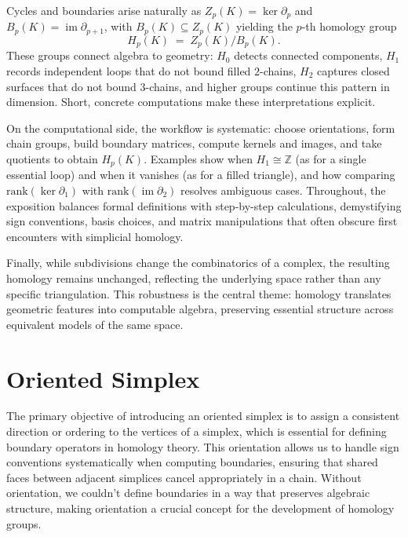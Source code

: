 \documentclass[12pt,oneside,reqno]{amsart}
\theoremstyle{plain}
\theoremstyle{definition}
\theoremstyle{remark}
\newcommand{\0}{{\textbf{0}}}
\begin{document}
Cycles and boundaries arise naturally as \(Z_p(K) = \ker \partial_p\) and \(B_p(K)=\operatorname{im}\partial_{p+1}\), with \(B_p(K)\subseteq Z_p(K)\) yielding the \(p\)-th homology group
\[
H_p(K) \;=\; Z_p(K)\big/ B_p(K).
\]
These groups connect algebra to geometry: \(H_0\) detects connected components, \(H_1\) records independent loops that do not bound filled \(2\)-chains, \(H_2\) captures closed surfaces that do not bound \(3\)-chains, and higher groups continue this pattern in dimension. Short, concrete computations make these interpretations explicit.

On the computational side, the workflow is systematic: choose orientations, form chain groups, build boundary matrices, compute kernels and images, and take quotients to obtain \(H_p(K)\). Examples show when \(H_1\cong \mathbb{Z}\) (as for a single essential loop) and when it vanishes (as for a filled triangle), and how comparing \(\mathrm{rank}(\ker \partial_1)\) with \(\mathrm{rank}(\operatorname{im}\partial_2)\) resolves ambiguous cases. Throughout, the exposition balances formal definitions with step-by-step calculations, demystifying sign conventions, basis choices, and matrix manipulations that often obscure first encounters with simplicial homology.

Finally, while subdivisions change the combinatorics of a complex, the resulting homology remains unchanged, reflecting the underlying space rather than any specific triangulation. This robustness is the central theme: homology translates geometric features into computable algebra, preserving essential structure across equivalent models of the same space.

% 

\section{Oriented Simplex}\label{s:Oriented Simplex}
The primary objective of introducing an oriented simplex is to assign a consistent direction or ordering to the vertices of a simplex, which is essential for defining boundary operators in homology theory. This orientation allows us to handle sign conventions systematically when computing boundaries, ensuring that shared faces between adjacent simplices cancel appropriately in a chain. Without orientation, we couldn’t define boundaries in a way that preserves algebraic structure, making orientation a crucial concept for the development of homology groups.
\end{document}
